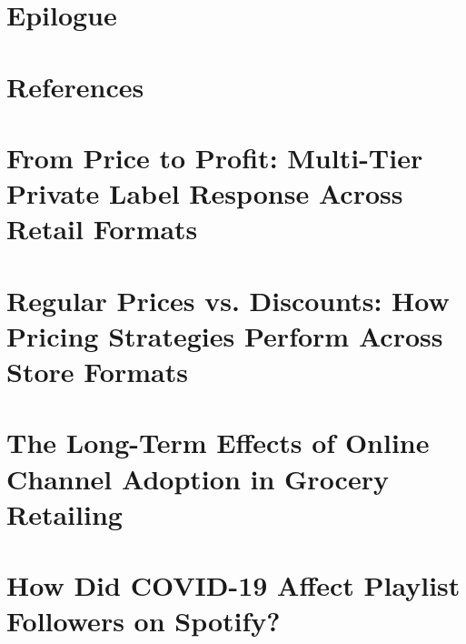 \documentclass[twoside,11pt,american,openright,final]{memoir}
\begin{document}
\chapter*{Epilogue}

\setcounter{figure}{0}
\renewcommand{\thefigure}{E\arabic{figure}}



\renewcommand{\thefigure}{\arabic{chapter}.\arabic{figure}}

\cleardoublepage
\chapter*{References}

\appendix

\chapter{From Price to Profit: Multi-Tier Private Label Response Across Retail Formats}
\label{app:article1}



\chapter{Regular Prices vs. Discounts: How Pricing Strategies Perform Across Store Formats}
\label{app:article2}



\chapter{The Long-Term Effects of Online Channel Adoption in Grocery Retailing}
\label{app:article3}



\chapter{How Did COVID-19 Affect Playlist Followers on Spotify?}
\label{app:article4}


\end{document}
